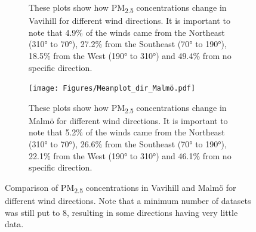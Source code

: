 \begin{figure}[H]
\begin{subfigure}[b]{0.49\textwidth}
        \caption{These plots show how PM\textsubscript{2.5} concentrations change in Vavihill for different wind directions. It is important to note that 4.9\% of the winds came from the Northeast (310° to 70°), 27.2\% from the Southeast (70° to 190°), 18.5\% from the West (190° to 310°) and 49.4\% from no specific direction.}
        \label{fig:Meanplot_dir_Vavihill}
    \end{subfigure}
    \hfill
    \begin{subfigure}[b]{0.49\textwidth}
        \centering
        \texttt{[image: Figures/Meanplot\_dir\_Malmö.pdf]}
        \caption{These plots show how PM\textsubscript{2.5} concentrations change in Malmö for different wind directions. It is important to note that 5.2\% of the winds came from the Northeast (310° to 70°), 26.6\% from the Southeast (70° to 190°), 22.1\% from the West (190° to 310°) and 46.1\% from no specific direction.}
        \label{fig:Meanplot_dir_Malmö}
    \end{subfigure}
    \caption{Comparison of PM\textsubscript{2.5} concentrations in Vavihill and Malmö for different wind directions. Note that a minimum number of datasets was still put to 8, resulting in some directions having very little data. }
    \label{fig:PM25_wind_direction}
\end{figure}

